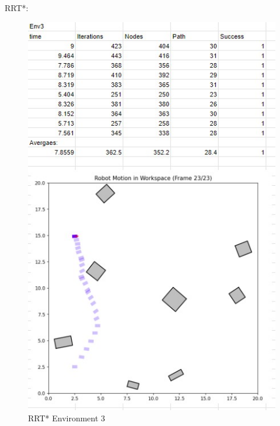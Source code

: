 \documentclass{article}
\begin{document}
    RRT*: 
    \begin{figure} [H]
        \centering
        \includegraphics[width=0.5\linewidth]{latex_media/RRTStarEnv3Stats.jpg}
        \caption{RRT* Environment 3}
    \end{figure}
\end{document}
